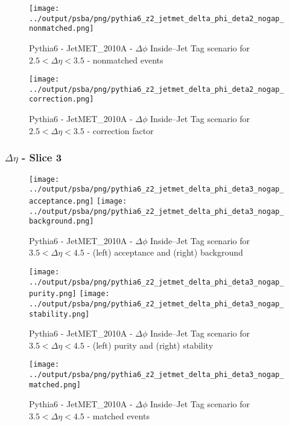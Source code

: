 \documentclass[11pt]{book}
\begin{document}
\begin{figure}[ht]
\centering
\texttt{[image: ../output/psba/png/pythia6\_z2\_jetmet\_delta\_phi\_deta2\_nogap\_nonmatched.png]}
\caption{Pythia6 - JetMET\_2010A - $\Delta\phi$ Inside--Jet Tag scenario for $2.5 < \Delta\eta < 3.5$ - nonmatched events}
\label{fig:p6_jetmet_delta_phi_deta2_nogap_nonmatched}
\end{figure}

\begin{figure}[ht]
\centering
\texttt{[image: ../output/psba/png/pythia6\_z2\_jetmet\_delta\_phi\_deta2\_nogap\_correction.png]}
\caption{Pythia6 - JetMET\_2010A - $\Delta\phi$ Inside--Jet Tag scenario for $2.5 < \Delta\eta < 3.5$ - correction factor}
\label{fig:p6_jetmet_delta_phi_deta2_nogap_correction}
\end{figure}

\clearpage
\subsubsection{$\Delta\eta$ - Slice 3}
\begin{figure}[ht]
\centering
\texttt{[image: ../output/psba/png/pythia6\_z2\_jetmet\_delta\_phi\_deta3\_nogap\_acceptance.png]}
\texttt{[image: ../output/psba/png/pythia6\_z2\_jetmet\_delta\_phi\_deta3\_nogap\_background.png]}
\caption{Pythia6 - JetMET\_2010A - $\Delta\phi$ Inside--Jet Tag scenario for $3.5 < \Delta\eta < 4.5$ - (left) acceptance and (right) background}
\label{fig:p6_jetmet_delta_phi_deta3_nogap_ab}
\end{figure}

\begin{figure}[ht]
\centering
\texttt{[image: ../output/psba/png/pythia6\_z2\_jetmet\_delta\_phi\_deta3\_nogap\_purity.png]}
\texttt{[image: ../output/psba/png/pythia6\_z2\_jetmet\_delta\_phi\_deta3\_nogap\_stability.png]}
\caption{Pythia6 - JetMET\_2010A - $\Delta\phi$ Inside--Jet Tag scenario for $3.5 < \Delta\eta < 4.5$ - (left) purity and (right) stability}
\label{fig:p6_jetmet_delta_phi_deta3_nogap_ps}
\end{figure}

\begin{figure}[ht]
\centering
\texttt{[image: ../output/psba/png/pythia6\_z2\_jetmet\_delta\_phi\_deta3\_nogap\_matched.png]}
\caption{Pythia6 - JetMET\_2010A - $\Delta\phi$ Inside--Jet Tag scenario for $3.5 < \Delta\eta < 4.5$ - matched events}
\label{fig:p6_jetmet_delta_phi_deta3_nogap_matched}
\end{figure}
\end{document}
